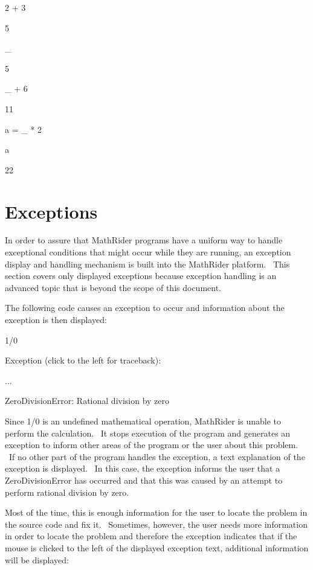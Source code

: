 \documentclass[12pt,twoside]{book}
\begin{document}
\bigskip

2 + 3

{\textbar}

5

\_

{\textbar}

5


\bigskip

\_ + 6

{\textbar}

11


\bigskip

a = \_ * 2

a

{\textbar}

22

\section[Exceptions]{Exceptions}
In order to assure that MathRider programs have a uniform way to handle
exceptional conditions that might occur while they are running, an
exception display and handling mechanism is built into the MathRider
platform. \ This section covers only displayed exceptions because
exception handling is an advanced topic that is beyond the scope of
this document.


\bigskip

The following code causes an exception to occur and information about
the exception is then displayed:


\bigskip

1/0

{\textbar}

Exception (click to the left for traceback):

...

ZeroDivisionError: Rational division by zero


\bigskip

Since 1/0 is an undefined mathematical operation, MathRider is unable to
perform the calculation. \ It stops execution of the program and
generates an exception to inform other areas of the program or the user
about this problem. \ If no other part of the program handles the
exception, a text explanation of the exception is displayed. \ In this
case, the exception informs the user that a ZeroDivisionError has
occurred and that this was caused by an attempt to perform
{\textquotedbl}rational division by zero{\textquotedbl}.


\bigskip

Most of the time, this is enough information for the user to locate the
problem in the source code and fix it. \ Sometimes, however, the user
needs more information in order to locate the problem and therefore the
exception indicates that if the mouse is clicked to the left of the
displayed exception text, additional information will be displayed:
\end{document}
